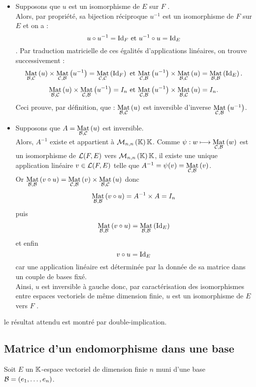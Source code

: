 \begin{dem}
    \begin{itemize}
        \item \impdir Supposons que \(u\) est un isomorphisme de \(E\) sur \(F\) .\\
        Alors, par propriété, sa bijection réciproque \(u^{-1}\) est un isomorphisme de \(F\) sur \(E\) et on a :
        \[u \circ u^{-1} = \id{F}\text{ et }u^{-1} \circ u = \id{E} \].
        Par traduction matricielle de ces égalités d’applications linéaires, on trouve successivement :
        \[\Mat{\cal{B}, \cal{C}}{u} \times \Mat{\cal{C}, \cal{B}}{u^{-1}} = \Mat{\cal{C}, \cal{C}}{\id{F}}\text{ et }\Mat{\cal{C}, \cal{B}}{u^{-1}} \times \Mat{\cal{B}, \cal{C}}{u} = \Mat{\cal{B}, \cal{B}}{\id{E}}.\]
        \[\Mat{\cal{B}, \cal{C}}{u} \times \Mat{\cal{C}, \cal{B}}{u^{-1}} = I_n \text{ et }\Mat{\cal{C}, \cal{B}}{u^{-1}} \times \Mat{\cal{B}, \cal{C}}{u} = I_n.\]
        Ceci prouve, par définition, que : \(\Mat{\cal{B}, \cal{C}}{u}\) est inversible d’inverse \(\Mat{\cal{C}, \cal{B}}{u^{-1}}\).
        \item \imprec Supposons que \(A = \Mat{\cal{B}, \cal{C}}{u}\) est inversible.\\
        Alors, \(A^{-1}\) existe et appartient à \(\M{n,n}{\K}\). Comme \(\psi : w \mapsto \Mat{\cal{C}, \cal{B}}{w}\) est un isomorphisme de \(\cal{L}(F, E)\) vers \(\M{n,n}{\K}\), il existe une unique application linéaire \(v \in \cal{L}(F, E)\) telle que \(A^{-1}= \psi(v) = \Mat{\cal{C}, \cal{B}}{v}\).\\
        Or \(\Mat{\cal{B}, \cal{B}}{v \circ u} = \Mat{\cal{C}, \cal{B}}{v} \times \Mat{\cal{B}, \cal{C}}{u}\) donc
        \[\Mat{\cal{B}, \cal{B}}{v \circ u} = A^{-1} \times A = I_n\]
        puis
        \[\Mat{\cal{B}, \cal{B}}{v \circ u} = \Mat{\cal{B}, \cal{B}}{\id{E}}\]
        et enfin
        \[v \circ u = \id{E}\]
        car une application linéaire est déterminée par la donnée de sa matrice dans un couple de bases fixé. \\
        Ainsi, \(u\) est inversible à gauche donc, par caractérisation des isomorphismes entre espaces vectoriels de même dimension finie, \(u\) est un isomorphisme de \(E\) vers \(F\) . 
    \end{itemize}
    \conclusion le résultat attendu est montré par double-implication.
\end{dem}


\subsection{Matrice d’un endomorphisme dans une base}
    Soit \(E\) un \(\K\)-espace vectoriel de dimension finie \(n\) muni d’une base \(\cal{B} = (e_1, \dots , e_n)\).

